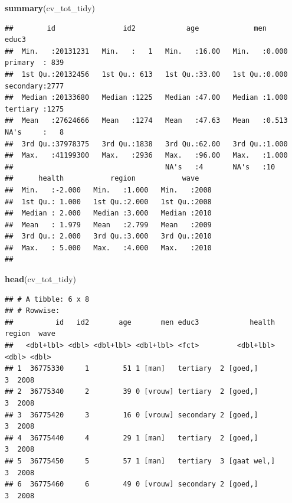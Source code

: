 \documentclass[
]{book}
\newenvironment{Shaded}{\begin{snugshade}}{\end{snugshade}}
\newcommand{\KeywordTok}[1]{\textcolor[rgb]{0.13,0.29,0.53}{\textbf{#1}}}
\newcommand{\NormalTok}[1]{#1}
\begin{document}
\begin{Shaded}
\begin{Highlighting}[numbers=left,,]
\KeywordTok{summary}\NormalTok{(cv_tot_tidy)}
\end{Highlighting}
\end{Shaded}

\begin{verbatim}
##        id                id2            age             men              educ3     
##  Min.   :20131231   Min.   :   1   Min.   :16.00   Min.   :0.000   primary  : 839  
##  1st Qu.:20132456   1st Qu.: 613   1st Qu.:33.00   1st Qu.:0.000   secondary:2777  
##  Median :20133680   Median :1225   Median :47.00   Median :1.000   tertiary :1275  
##  Mean   :27624666   Mean   :1274   Mean   :47.63   Mean   :0.513   NA's     :   8  
##  3rd Qu.:37978375   3rd Qu.:1838   3rd Qu.:62.00   3rd Qu.:1.000                   
##  Max.   :41199300   Max.   :2936   Max.   :96.00   Max.   :1.000                   
##                                    NA's   :4       NA's   :10                      
##      health           region           wave     
##  Min.   :-2.000   Min.   :1.000   Min.   :2008  
##  1st Qu.: 1.000   1st Qu.:2.000   1st Qu.:2008  
##  Median : 2.000   Median :3.000   Median :2010  
##  Mean   : 1.979   Mean   :2.799   Mean   :2009  
##  3rd Qu.: 2.000   3rd Qu.:3.000   3rd Qu.:2010  
##  Max.   : 5.000   Max.   :4.000   Max.   :2010  
## 
\end{verbatim}

\begin{Shaded}
\begin{Highlighting}[numbers=left,,]
\KeywordTok{head}\NormalTok{(cv_tot_tidy)}
\end{Highlighting}
\end{Shaded}

\begin{verbatim}
## # A tibble: 6 x 8
## # Rowwise: 
##          id   id2       age       men educ3            health region  wave
##   <dbl+lbl> <dbl> <dbl+lbl> <dbl+lbl> <fct>         <dbl+lbl>  <dbl> <dbl>
## 1  36775330     1        51 1 [man]   tertiary  2 [goed,]          3  2008
## 2  36775340     2        39 0 [vrouw] tertiary  2 [goed,]          3  2008
## 3  36775420     3        16 0 [vrouw] secondary 2 [goed,]          3  2008
## 4  36775440     4        29 1 [man]   tertiary  2 [goed,]          3  2008
## 5  36775450     5        57 1 [man]   tertiary  3 [gaat wel,]      3  2008
## 6  36775460     6        49 0 [vrouw] secondary 2 [goed,]          3  2008
\end{verbatim}
\end{document}

